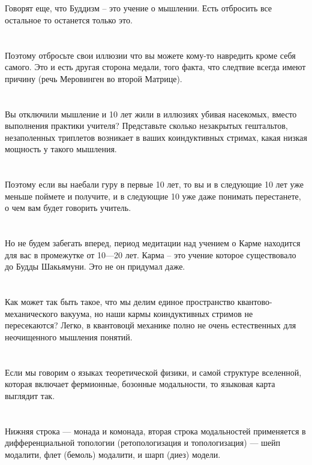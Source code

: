 \\
\\
Говорят еще, что Буддизм -- это учение о мышлении. Есть отбросить все остальное то останется только это.\\
\\
\\
Поэтому отбросьте свои иллюзии что вы можете кому-то навредить кроме себя самого. Это и есть другая сторона медали, того факта, что следтвие всегда имеют причину (речь Меровинген во второй Матрице).\\
\\
\\
Вы отключили мышление и 10 лет жили в иллюзиях убивая насекомых, вместо выполнения практики учителя? Представьте сколько незакрытых гештальтов, незаполенных триплетов возникает в ваших коиндуктивных стримах, какая низкая мощность у такого мышления.\\
\\
\\
Поэтому если вы наебали гуру в первые 10 лет, то вы и в следующие 10 лет уже меньше поймете и получите, и в следующие 10 уже даже понимать перестанете, о чем вам будет говорить учитель.\\
\\
\\
Но не будем забегать вперед, период медитации над учением о Карме находится для вас в промежутке от 10---20 лет. Карма -- это учение которое существовало до Будды Шакьямуни. Это не он придумал даже.\\
\\
\\
Как может так быть такое, что мы делим единое пространство квантово-механического вакуума, но наши кармы коиндуктивных стримов не пересекаются? Легко, в квантовоцй механике полно не очень естественных для неочищенного мышления понятий.\\
\\
\\
Если мы говорим о языках теоретической физики, и самой структуре вселенной, которая включает фермионные, бозонные модальности, то языковая карта выглядит так.\\
\\
\\
Нижняя строка — монада и комонада, вторая строка модальностей применяется в дифференциальной топологии (ретопологизация и топологизация) — шейп модалити, флет (бемоль) модалити, и шарп (диез) модели.\\
\\
